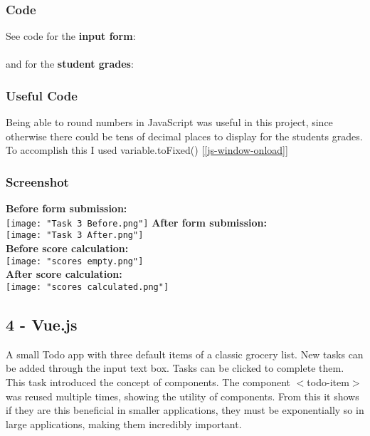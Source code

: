 \documentclass[12pt]{report}
\begin{document}
				\subsubsection{Code}
					See code for the \textbf{input form}: \\
					\\

					\hspace{-0.8cm} and for the \textbf{student grades}: \\

				\subsubsection{Useful Code}
					Being able to round numbers in JavaScript was useful in this project, since otherwise there could be tens of decimal places to display for the students grades. To accomplish this I used variable.toFixed() [\ref{js-window-onload}]
				\subsubsection{Screenshot}
					\textbf{Before form submission:} \\
					\texttt{[image: "Task 3 Before.png"]}
					\textbf{After form submission:}\\
					\texttt{[image: "Task 3 After.png"]}\\
					\textbf{Before score calculation:} \\
					\texttt{[image: "scores empty.png"]}\\
					\textbf{After score calculation:}\\
					\texttt{[image: "scores calculated.png"]}

			\subsection{4 - Vue.js}
				A small Todo app with three default items of a classic grocery list. New tasks can be added through the input text box. Tasks can be clicked to complete them. \\

				This task introduced the concept of components. The component $<$todo-item$>$ was reused multiple times, showing the utility of components. From this it shows if they are this beneficial in smaller applications, they must be exponentially so in large applications, making them incredibly important.
\end{document}
